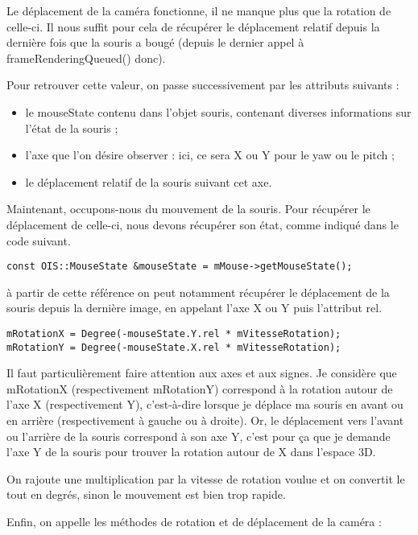 Le déplacement de la caméra fonctionne, il ne manque plus que la rotation de celle-ci. Il nous suffit pour cela de récupérer le déplacement relatif depuis la dernière fois que la souris a bougé (depuis le dernier appel à frameRenderingQueued() donc).

Pour retrouver cette valeur, on passe successivement par les attributs suivants :
\begin{itemize}
\item le mouseState contenu dans l'objet souris, contenant diverses informations sur l'état de la souris ;
\item l'axe que l'on désire observer : ici, ce sera X ou Y pour le yaw ou le pitch ;
\item le déplacement relatif de la souris suivant cet axe.
\end{itemize}

Maintenant, occupons-nous du mouvement de la souris. Pour récupérer le déplacement de celle-ci, nous devons récupérer son état, comme indiqué dans le code suivant.


\begin{lstlisting}[caption={}]
const OIS::MouseState &mouseState = mMouse->getMouseState();
\end{lstlisting}

à partir de cette référence on peut notamment récupérer le déplacement de la souris depuis la dernière image, en appelant l'axe X ou Y puis l'attribut rel.


\begin{lstlisting}[caption={}]
mRotationX = Degree(-mouseState.Y.rel * mVitesseRotation);
mRotationY = Degree(-mouseState.X.rel * mVitesseRotation);
\end{lstlisting}

Il faut particulièrement faire attention aux axes et aux signes. Je considère que mRotationX (respectivement mRotationY) correspond à la rotation autour de l'axe X (respectivement Y), c'est-à-dire lorsque je déplace ma souris en avant ou en arrière (respectivement à gauche ou à droite). Or, le déplacement vers l'avant ou l'arrière de la souris correspond à son axe Y, c'est pour ça que je demande l'axe Y de la souris pour trouver la rotation autour de X dans l'espace 3D.

On rajoute une multiplication par la vitesse de rotation voulue et on convertit le tout en degrés, sinon le mouvement est bien trop rapide.

Enfin, on appelle les méthodes de rotation et de déplacement de la caméra :


